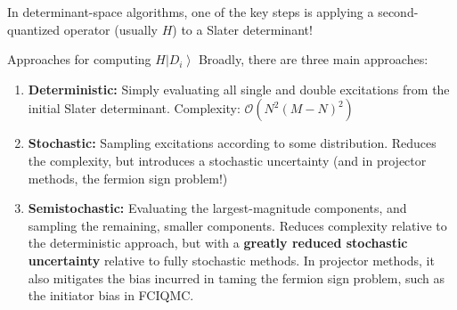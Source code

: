 \documentclass[amsmath]{beamer}
\begin{document}
\begin{frame}
	\small
	In determinant-space algorithms, one of the key steps is applying a second-quantized operator (usually $H$) to a Slater determinant!
	\begin{enumerate}
	\end{enumerate}
\end{frame}

\begin{frame}{Approaches for computing $H\left|D_i\right\rangle$}
	\small
	Broadly, there are three main approaches:
	\begin{enumerate}
		\item {\bf Deterministic:} Simply evaluating all single and double excitations from the initial Slater determinant. Complexity: $\mathcal{O}(N^2 (M-N)^2)$
		\item {\bf Stochastic:} Sampling excitations according to some distribution. Reduces the complexity, but introduces a stochastic uncertainty (and in projector methods, the fermion sign problem!)
		\item {\bf Semistochastic:} Evaluating the largest-magnitude components, and sampling the remaining, smaller components. Reduces complexity relative to the deterministic approach, but with a \textbf{greatly reduced stochastic uncertainty} relative to fully stochastic methods. In projector methods, it also mitigates the bias incurred in taming the fermion sign problem, such as the initiator bias in FCIQMC.
	\end{enumerate}
\end{frame}
\end{document}
